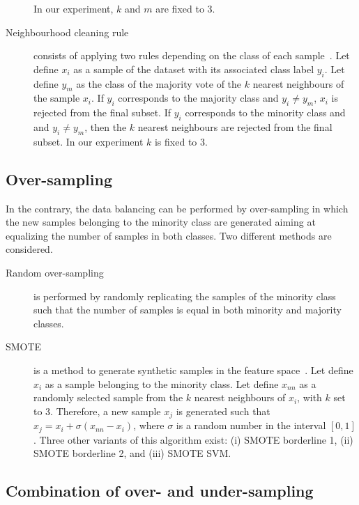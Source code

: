 \documentclass[twoside,11pt]{article}
\begin{document}
\begin{description}
In our experiment, $k$ and $m$ are fixed to 3.
  \item[Neighbourhood cleaning rule] consists of applying two rules depending on the class of each sample~\cite{laurikkala2001improving}.
Let define $x_i$ as a sample of the dataset with its associated class label $y_i$.
Let define $y_m$ as the class of the majority vote of the $k$ nearest neighbours of the sample $x_i$.
If $y_i$ corresponds to the majority class and $y_i \neq y_m$, $x_i$ is rejected from the final subset.
If $y_i$ corresponds to the minority class and and $y_i \neq y_m$, then the $k$ nearest neighbours are rejected from the final subset.
In our experiment $k$ is fixed to 3.
\end{description}

\subsection{Over-sampling}

In the contrary, the data balancing can be performed by over-sampling in which the new samples belonging to the minority class are generated aiming at equalizing the number of samples in both classes.
Two different methods are considered.
\begin{description}
\item[Random over-sampling] is performed by randomly replicating the samples of the minority class such that the number of samples is equal in both minority and majority classes.
\end{description}
\begin{description}
\item[SMOTE] is a method to generate synthetic samples in the feature space~\cite{chawla2002smote}.
Let define $x_i$ as a sample belonging to the minority class.
Let define $x_{nn}$ as a randomly selected sample from the $k$ nearest neighbours of $x_i$, with $k$ set to 3.
Therefore, a new sample $x_j$ is generated such that $x_j = x_i + \sigma \left( x_{nn} - x_i \right)$, where $\sigma$ is a random number in the interval $\left[0,1\right]$.
Three other variants of this algorithm exist: (i) SMOTE borderline 1, (ii) SMOTE borderline 2, and (iii) SMOTE SVM.
\end{description}

\subsection{Combination of over- and under-sampling}
\end{document}
